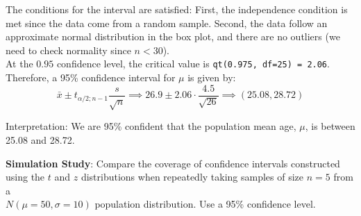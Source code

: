 \documentclass[fleqn, 12pt]{article}\usepackage[]{graphicx}\usepackage[]{color}
\begin{document}
{\color{blue} The conditions for the interval are satisfied:  First, the independence condition is met since the data come from a random sample.  Second, the data follow an approximate normal distribution in the box plot, and there are no outliers (we need to check normality since $n < 30$).\\   

At the $0.95$ confidence level, the critical value is \texttt{qt(0.975, df=25) = 2.06}. Therefore, a 95\% confidence interval for $\mu$ is given by:
$$\bar{x} \pm t_{\alpha / 2; n-1} \frac{s}{\sqrt{n}}
\implies 26.9 \pm 2.06 \cdot \frac{4.5}{\sqrt{26}}
\implies (25.08, 28.72)$$

Interpretation: We are 95\% confident that the population mean age, $\mu$, is between 25.08 and 28.72.
}




\clearpage
\textbf{Simulation Study}:  Compare the coverage of confidence intervals constructed using the $t$ and $z$ distributions when repeatedly taking samples of size $n=5$ from a\\ $N(\mu=50,\sigma=10)$ population distribution.  Use a 95\% confidence level.
\end{document}

